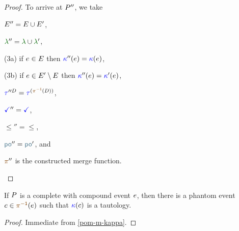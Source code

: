 \begin{lemma}
\begin{proof}
    To arrive at $P''$, we take
    \begin{enumerate*}
    \item
      $E''=E\cup E'$,
    \item
      $\labeling''=\labeling\cup\labeling'$,
    \item[(3a)]
      if $e\in E$ then ${\color{blue}\kappa}''(e)={\color{blue}\kappa}(e)$,
    \item[(3b)]
      if $e\in E'\setminus E$ then ${\color{blue}\kappa}''(e)={\color{blue}\kappa}'(e)$,
    \item
      $\aTr{\prime\prime\bEvs}{}=\aTr{(\fmrginv{\bEvs})}{}$,
    \item
      $\aTerm''=\aTerm$,
    \item 
      ${\le''}={\le}$,
    \item 
      ${\rpox''}={\rpox'}$, and
    \item 
      $\fmrg{}''$ is the constructed merge function. %
    \end{enumerate*}
  \end{proof}
\end{lemma}

\begin{lemma}
  If $P$ is a complete \PwTpo{} with compound event $e$,
  then
  there is a phantom event $\cEv\in\fmrginv{\aEv}$
  such that
  ${\color{blue}\kappa}(c)$ is a tautology.
  \begin{proof}
    Immediate from \ref{pom-m-kappa}.
  \end{proof}
\end{lemma}

